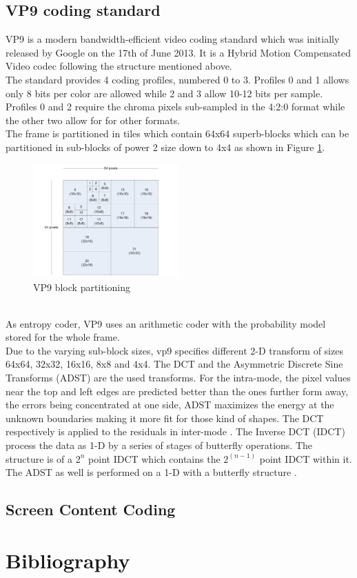 \documentclass[a4paper,11pt,oneside]{article}
\begin{document}
\subsection{VP9 coding standard}
VP9 is a modern bandwidth-efficient video coding standard which was initially released by Google on the 17th of June 2013. It is a Hybrid Motion Compensated Video codec following the structure mentioned above. \\
\indent The standard provides 4 coding profiles, numbered 0 to 3. Profiles 0 and 1 allows only 8 bits per color are allowed while 2 and 3 allow 10-12 bits per sample. Profiles 0 and 2 require the chroma pixels sub-sampled in the 4:2:0 format while the other two allow for for other formats\cite[pp.~23]{vp9_bitstream}.\\
\indent The frame is partitioned in tiles which contain 64x64 superb-blocks which can be partitioned in sub-blocks of power 2 size down to 4x4 as shown in Figure \ref{figure:vp9_block_partitioning}.
\begin{figure}[h]
  \centering
  \includegraphics[width=0.5\textwidth]{../figures/frame_partitioning.pdf}
  \caption{VP9 block partitioning \cite[pp.~15]{vp9_bitstream}}
  \label{figure:vp9_block_partitioning}
\end{figure} \\
\indent As entropy coder, VP9 uses an arithmetic coder with the probability model stored for the whole frame.\\
\indent Due to the varying sub-block sizes, vp9 specifies different 2-D transform of sizes 64x64, 32x32, 16x16, 8x8 and 4x4. The DCT and the Asymmetric Discrete Sine Transforms (ADST) are the used transforms. For the intra-mode, the pixel values near the top and left edges are predicted better than the ones further form away, the errors being concentrated at one side, ADST maximizes the energy at the unknown boundaries making it more fit for those kind of shapes. The DCT respectively is applied to the residuals in inter-mode \cite[pp.~16]{vp9_bitstream}. 
The Inverse DCT (IDCT) process the data as 1-D by a series of stages of butterfly operations. The structure is of a $2^n$ point IDCT which contains the $2^(n-1)$ point IDCT within it. The ADST as well is performed on a 1-D with a butterfly structure \cite[pp.~18-19]{vp9_bitstream}. \\


\subsection{Screen Content Coding}






\newpage
\section*{Bibliography}
\printbibliography
\end{document}
